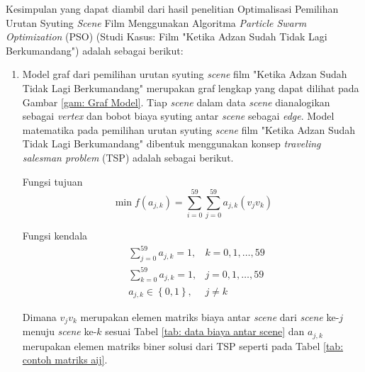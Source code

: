 {\frenchspacing
    Kesimpulan yang dapat diambil dari hasil penelitian Optimalisasi Pemilihan Urutan Syuting \textit{Scene} Film Menggunakan Algoritma \textit{Particle Swarm Optimization} (PSO) (Studi Kasus: Film "Ketika Adzan Sudah Tidak Lagi Berkumandang") adalah sebagai berikut:

    \begin{enumerate}[align = left, left = 0cm, nolistsep]
        \item Model graf dari pemilihan urutan syuting \textit{scene} film "Ketika Adzan Sudah Tidak Lagi Berkumandang" merupakan graf lengkap yang dapat dilihat pada Gambar \ref{gam: Graf Model}.
              Tiap \textit{scene} dalam data \textit{scene} dianalogikan sebagai \textit{vertex} dan bobot biaya syuting antar \textit{scene} sebagai \textit{edge}.
              Model matematika pada pemilihan urutan syuting \textit{scene} film "Ketika Adzan Sudah Tidak Lagi Berkumandang" dibentuk menggunakan konsep \textit{traveling salesman problem} (TSP) adalah sebagai berikut.

              \noindent
              Fungsi tujuan
              \begin{equation}
                  \label{pers: model matematika penelitian}
                  \operatorname{min} f(a_{j,k}) = \sum^{59}_{i=0} \sum^{59}_{j=0} a_{j,k}(v_{j}v_{k})
              \end{equation}

              \noindent
              Fungsi kendala
              \begin{equation*}
                  \begin{aligned}
                       & \sum^{59}_{j=0} a_{j,k} = 1,    & k = 0,1,\dots,59 \\
                       & \sum^{59}_{k=0} a_{j,k} = 1,    & j = 0,1,\dots,59 \\
                       & a_{j,k} \in \left\{0,1\right\}, & j \neq k
                  \end{aligned}
              \end{equation*}

              \noindent
              Dimana $v_{j}v_{k}$ merupakan elemen matriks biaya antar \textit{scene} dari \textit{scene} ke-$j$ menuju \textit{scene} ke-$k$ sesuai Tabel \ref{tab: data biaya antar scene}
              dan $a_{j,k}$ merupakan elemen matriks biner solusi dari TSP seperti pada Tabel \ref{tab: contoh matriks aij}.


\end{enumerate}}

